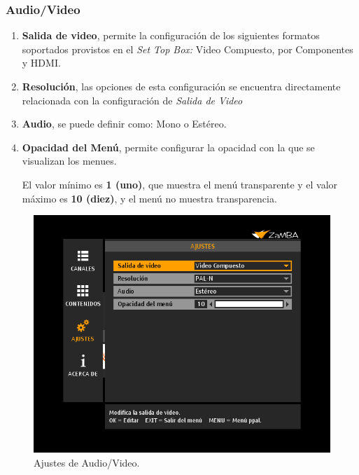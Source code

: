 \documentclass{article}
\begin{document}
\subsubsection{Audio/Video}
	\begin{enumerate}[label*=\arabic*.]
	\item \textbf{Salida de video}, permite la configuración de los siguientes formatos soportados provistos en el \textit{Set Top Box:} Video Compuesto, por Componentes y HDMI.
	\item \textbf{Resolución}, las opciones de esta configuración se encuentra directamente relacionada con la configuración de \textit{Salida de Video}
	\item \textbf{Audio}, se puede definir como: Mono o Estéreo.
	\item \textbf{Opacidad del Menú}, permite configurar la opacidad con la que se visualizan los menues. 
	
El valor mínimo es \textbf{1 (uno)}, que muestra el menú transparente y el valor máximo es \textbf{10 (diez)}, y el menú no muestra transparencia.
	\end{enumerate}
	
	\begin{figure}[h]
		\centerline{\includegraphics[scale=0.50,keepaspectratio=true]{ajustes_av}}
		\caption{Ajustes de Audio/Video.}
	\end{figure}
	
\end{document}
